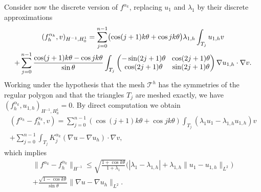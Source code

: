 \documentclass[11pt]{article}
\numberwithin{equation}{section}\newtheorem*{jepEnonce}{\jepEnonceTitle}\newenvironment{enonce*}[1]{\def\jepEnonceTitle{#1}\jepEnonce}{\endjepEnonce}\newtheorem*{conj*}{Conjecture}
\newcommand{\colsep}{\arraycolsep4.5pt}
\theoremstyle{plain}
\theoremstyle{definition}
\begin{document}
Consider now the discrete version of $f^{\alpha_k}$, replacing $u_1$ and $\lambda_1$ by their discrete approximations\vspace*{-5pt}
\begin{multline*}
(f_h^{\alpha_k},v)_{H^{-1},H_0^1} = \sum_{j=0}^{n-1} \bigl(\cos (j+1)k\theta+\cos jk\theta\bigr) \lambda_{1,h} \int_{T_j} u_{1,h}v\\
\colsep+ \sum_{j=0}^{n-1} \frac{\cos(j+1)k\theta-\cos jk\theta}{\sin \theta} \int_{T_j}\begin{pmatrix}
-\sin (2j+1)\theta & \cos (2j+1) \theta \\
\cos(2j+1)\theta & \sin (2j+1)\theta
\end{pmatrix}\nabla u_{1,h} \cdot \nabla v.
\end{multline*}
Working under the hypothesis that the mesh $\mathcal T^h$ has the symmetries of the regular polygon and that the triangles $T_j$ are meshed exactly, we have $(f_h^{\alpha_k},u_{1,h})_{H^{-1},H_0^1} = 0$. By direct computation we obtain\vspace*{-5pt}
\begin{multline*}
(f^{\alpha_k}-f^{\alpha_k}_h,v) = \sum_{j=0}^{n-1} (\cos (j+1)k\theta+\cos jk\theta) \int_{T_j}(\lambda_1 u_1-\lambda_{1,h}u_{1,h})v\\[-8pt]
+ \sum_{j=0}^{n-1} \int_{T_j}K_j^{\alpha_k}(\nabla u - \nabla u_h)\cdot \nabla v,
\end{multline*}
which implies
\vspace*{-5pt}
\begin{multline*}
\|f^{\alpha_k}-f_h^{\alpha_k} \|_{H^{-1}} \leq \sqrt{\frac{1+\cos k\theta}{1+\lambda_1}}\bigl(|\lambda_1-\lambda_{1,h}|+\lambda_{1,h}\|u_1-u_{1,h}\|_{L^2}\bigr)\\
+ \frac{\sqrt{1-\cos k\theta}}{\sin \theta} \|\nabla u-\nabla u_h\|_{L^2}.
\end{multline*}
\end{document}
